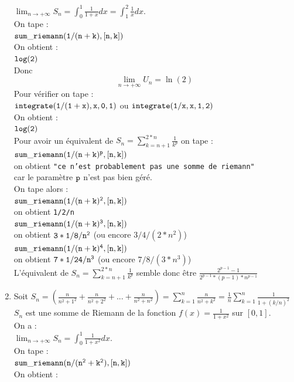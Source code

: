 \documentclass[a4paper,11pt]{book}
\begin{document}
\begin{enumerate}
$\displaystyle \lim_{n \rightarrow +\infty} S_n=\int_0^1\frac{1}{1+x} dx=
\int_1^2\frac{1}{x} dx$.\\
On tape :\\
${\tt sum\_riemann(1/(n+k),[n,k])}$\\
On obtient :\\
${\tt log(2)}$\\
Donc $$\displaystyle \lim_{n \rightarrow +\infty} U_n=\ln(2)$$
Pour v\'erifier on tape :\\
${\tt integrate(1/(1+x),x,0,1)}$ ou ${\tt integrate(1/x,x,1,2)}$\\
On obtient :\\
${\tt log(2)}$\\
Pour avoir un \'equivalent de  $\displaystyle S_n=\sum_{k=n+1}^{2*n} \frac{1}{k^p}$ on tape :\\
${\tt sum\_riemann(1/(n+k)^p,[n,k])}$\\
on obtient {\tt "ce n'est probablement pas une somme de riemann"}\\
car le param\`etre ${\tt p}$ n'est pas bien g\'er\'e.\\
 On tape alors :\\
${\tt sum\_riemann(1/(n+k)^2,[n,k])}$\\
on obtient {\tt 1/2/n}\\
${\tt sum\_riemann(1/(n+k)^3,[n,k])}$\\
on obtient ${\tt 3*1/8/n^2}$ (ou encore $3/4/(2*n^2)$)\\
${\tt sum\_riemann(1/(n+k)^4,[n,k])}$\\
on obtient ${\tt 7*1/24/n^3}$ (ou encore $7/8/(3*n^3)$)\\
L'\'equivalent de $\displaystyle S_n=\sum_{k=n+1}^{2*n} \frac{1}{k^p}$ semble donc \^etre 
$\displaystyle\frac{2^{p-1}-1}{2^{p-1}*(p-1)*n^{p-1}}$
\item
Soit $\displaystyle S_n=(\frac{n}{n^2+1^2}+\frac{n}{n^2+2^2}+...+\frac{n}{n^2+n^2})=\sum_{k=1}^n \frac{n}{n^2+k^2}=\frac{1}{n}\sum_{k=1}^n \frac{1}{1+(k/n)^2}$\\
$S_n$ est une somme de Riemann de la fonction $\displaystyle f(x)=\frac{1}{1+x^2}$ sur $[0,1]$.\\
On a :\\
$\displaystyle \lim_{n \rightarrow +\infty} S_n=\int_0^1\frac{1}{1+x^2} dx$.\\
On tape :\\
${\tt sum\_riemann(n/(n^2+k^2),[n,k])}$\\
On obtient :\\

\end{enumerate}
\end{document}
